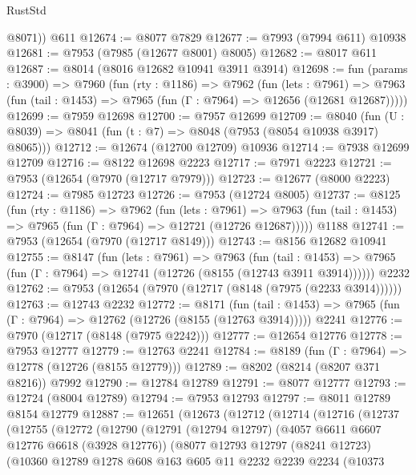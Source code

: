 \begin{lexlean}{RustStd}
\begin{coremodule}
        @8071))
    @611
@12674 := @8077 @7829
@12677 := @7993 (@7994 @611) @10938
@12681 := @7953 (@7985 (@12677 @8001) @8005)
@12682 := @8017 @611
@12687 := @8014 (@8016 @12682 @10941 @3911 @3914)
@12698 := fun (params : @3900) =>
  @7960
    (fun (rty : @1186) =>
    @7962
      (fun (lets : @7961) =>
      @7963 (fun (tail : @1453) => @7965 (fun (Γ : @7964) => @12656 (@12681 @12687)))))
@12699 := @7959 @12698
@12700 := @7957 @12699
@12709 := @8040
    (fun (U : @8039) => @8041 (fun (t : @7) => @8048 (@7953 (@8054 @10938 @3917) @8065)))
@12712 := @12674 (@12700 @12709) @10936
@12714 := @7938 @12699 @12709
@12716 := @8122 @12698 @2223
@12717 := @7971 @2223
@12721 := @7953 (@12654 (@7970 (@12717 @7979)))
@12723 := @12677 (@8000 @2223)
@12724 := @7985 @12723
@12726 := @7953 (@12724 @8005)
@12737 := @8125
    (fun (rty : @1186) =>
    @7962
      (fun (lets : @7961) =>
      @7963 (fun (tail : @1453) => @7965 (fun (Γ : @7964) => @12721 (@12726 @12687)))))
    @1188
@12741 := @7953 (@12654 (@7970 (@12717 @8149)))
@12743 := @8156 @12682 @10941
@12755 := @8147
    (fun (lets : @7961) =>
    @7963
      (fun (tail : @1453) =>
      @7965 (fun (Γ : @7964) => @12741 (@12726 (@8155 (@12743 @3911 @3914))))))
    @2232
@12762 := @7953 (@12654 (@7970 (@12717 (@8148 (@7975 (@2233 @3914))))))
@12763 := @12743 @2232
@12772 := @8171
    (fun (tail : @1453) => @7965 (fun (Γ : @7964) => @12762 (@12726 (@8155 (@12763 @3914)))))
    @2241
@12776 := @7970 (@12717 (@8148 (@7975 @2242)))
@12777 := @12654 @12776
@12778 := @7953 @12777
@12779 := @12763 @2241
@12784 := @8189 (fun (Γ : @7964) => @12778 (@12726 (@8155 @12779)))
@12789 := @8202 (@8214 (@8207 @371 @8216)) @7992
@12790 := @12784 @12789
@12791 := @8077 @12777
@12793 := @12724 (@8004 @12789)
@12794 := @7953 @12793
@12797 := @8011 @12789 @8154 @12779
@12887 := @12651
    (@12673
      (@12712
        (@12714
          (@12716
            (@12737
              (@12755
                (@12772
                  (@12790
                    (@12791
                      (@12794 @12797)
                      (@4057 @6611 @6607 @12776 @6618 (@3928 @12776))
                      (@8077
                        @12793
                        @12797
                        (@8241 @12723)
                        (@10360
                          @12789
                          @1278
                          @608
                          @163
                          @605
                          @11
                          @2232
                          @2239
                          @2234
                          (@10373

\end{coremodule}
\end{lexlean}
